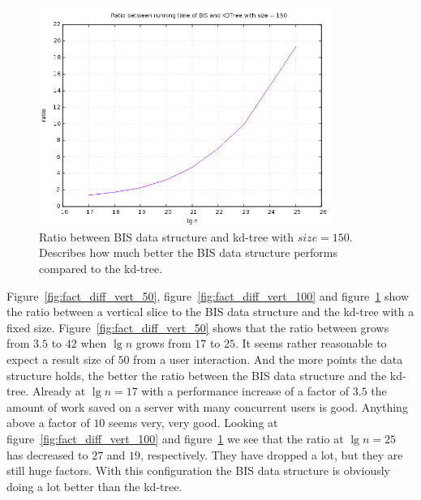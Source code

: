 \begin{figure}[h]
    \centering
    \includegraphics[width = 0.85\textwidth]{pictures/analysis/factor_difference_vert_150.png}
    \caption{Ratio between BIS data structure and kd-tree with $size=150$. Describes how much better the BIS data structure performs compared to the kd-tree.}\label{fig:fact_diff_vert_150}
\end{figure}
\clearpage

Figure~\ref{fig:fact_diff_vert_50}, figure~\ref{fig:fact_diff_vert_100} and figure~\ref{fig:fact_diff_vert_150} show the ratio between a vertical slice to the BIS data structure and the kd-tree with a fixed size. Figure~\ref{fig:fact_diff_vert_50} shows that the ratio between grows from $3.5$ to $42$ when $\lg n$ grows from $17$ to $25$. It seems rather reasonable to expect a result size of $50$ from a user interaction. And the more points the data structure holds, the better the ratio between the BIS data structure and the kd-tree. Already at $\lg n = 17$ with a performance increase of a factor of $3.5$ the amount of work saved on a server with many concurrent users is good. Anything above a factor of $10$ seems very, very good. Looking at figure~\ref{fig:fact_diff_vert_100} and figure~\ref{fig:fact_diff_vert_150} we see that the ratio at $\lg n = 25$ has decreased to $27$ and $19$, respectively. They have dropped a lot, but they are still huge factors. With this configuration the BIS data structure is obviously doing a lot better than the kd-tree.




